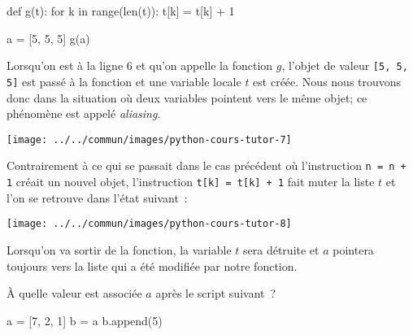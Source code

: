 \documentclass{magnolia}
\begin{document}
\begin{pythoncodeline}
def g(t):
    for k in range(len(t)):
        t[k] = t[k] + 1

a = [5, 5, 5]
g(a)
\end{pythoncodeline}
\noindent
Lorsqu'on est à la ligne 6 et qu'on appelle la fonction $g$, l'objet de valeur \verb![5, 5, 5]! est passé
à la fonction et une variable locale $t$ est créée. Nous nous trouvons donc dans la situation où deux variables
pointent vers le même objet; ce phénomène est appelé \emph{aliasing}.
\begin{center}
\texttt{[image: ../../commun/images/python-cours-tutor-7]}
\end{center}
\noindent
Contrairement à ce qui se passait dans le cas précédent où l'instruction \verb!n = n + 1! créait un nouvel
objet, l'instruction \verb!t[k] = t[k] + 1! fait muter la liste $t$ et l'on se retrouve dans l'état
suivant~:
\begin{center}
\texttt{[image: ../../commun/images/python-cours-tutor-8]}
\end{center}
\noindent Lorsqu'on va sortir de la fonction, la variable $t$ sera détruite et $a$ pointera toujours vers
la liste qui a été modifiée par notre fonction.
\vspace{2ex}
\begin{exoUnique}
\exo À quelle valeur est associée $a$ après le script suivant~?
\begin{pythoncode}
a = [7, 2, 1]
b = a
b.append(5)
\end{pythoncode}
\end{exoUnique}
\vspace{2ex}
\end{document}
